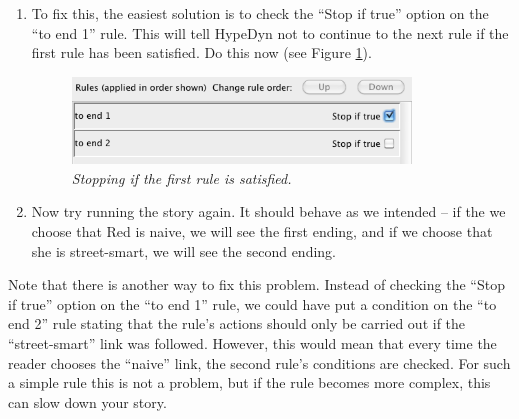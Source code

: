 \documentclass{article}
\begin{document}
\begin{enumerate}
So in our case, HypeDyn first looks at the ``to end 1'' rule. In the case where
the reader has chosen ``street-smart'', HypeDyn will check the conditions for
``to end 1'', see that they are not satisfied, and then move on to the second
rule. Since there are no conditions on the second rule, HypeDyn carries out its
actions, taking the reader to node ``end 2''. This is what we want.

If the ``naive'' link has been followed, HypeDyn checks the conditions for the
``to end 1'' rule, sees that they \textit{are} satisfies, and carries out the
action, taking the reader to node ``end 1''. It then looks at the ``Stop if
true'' option, which is not checked, and moves on to the second rule, ``to end
2''. Since there are no conditions on the second rule, HypeDyn carries out its
actions, taking the reader to node ``end 2''. This is \textit{not} what we want!

\item To fix this, the easiest solution is to check the ``Stop if true'' option
on the ``to end 1'' rule. This will tell HypeDyn not to continue to the next rule
if the first rule has been satisfied. Do this now (see Figure
\ref{fig:tut2:rules_with_stop}).

\begin{figure}[h]
  \centering
  \includegraphics[width=9cm]{images/hypedyn-tutorial-2-figure-6}
  \caption{\textit{Stopping if the first rule is satisfied.}}
  \label{fig:tut2:rules_with_stop}
\end{figure}\item 

Now try running the story again. It should behave as we intended -- if the
we choose that Red is naive, we will see the first ending, and if we choose
that she is street-smart, we will see the second ending.

\end{enumerate}

Note that there is another way to fix this problem. Instead of checking the
``Stop if true'' option on the ``to end 1'' rule, we could have put a condition
on the ``to end 2'' rule stating that the rule's actions should only be carried
out if the ``street-smart'' link was followed. However, this would mean that
every time the reader chooses the ``naive'' link, the second rule's conditions
are checked. For such a simple rule this is not a problem, but if the rule
becomes more complex, this can slow down your story.
\end{document}
